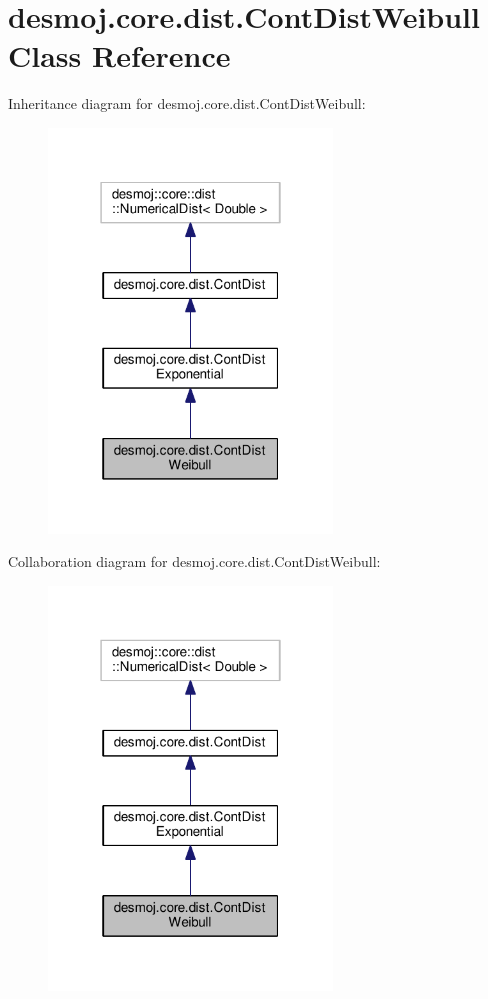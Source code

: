 \section{desmoj.\-core.\-dist.\-Cont\-Dist\-Weibull Class Reference}
\label{classdesmoj_1_1core_1_1dist_1_1_cont_dist_weibull}


Inheritance diagram for desmoj.\-core.\-dist.\-Cont\-Dist\-Weibull\-:
\nopagebreak
\begin{figure}[H]
\begin{center}
\leavevmode
\includegraphics[width=214pt]{classdesmoj_1_1core_1_1dist_1_1_cont_dist_weibull__inherit__graph}
\end{center}
\end{figure}


Collaboration diagram for desmoj.\-core.\-dist.\-Cont\-Dist\-Weibull\-:
\nopagebreak
\begin{figure}[H]
\begin{center}
\leavevmode
\includegraphics[width=214pt]{classdesmoj_1_1core_1_1dist_1_1_cont_dist_weibull__coll__graph}
\end{center}
\end{figure}
